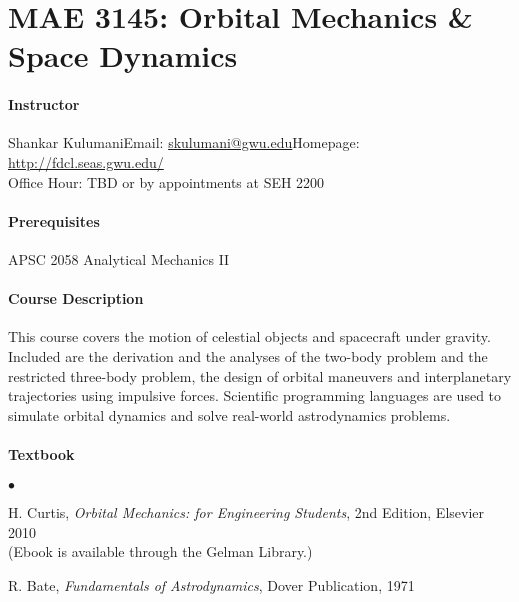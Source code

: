\documentclass[10pt]{article}
\date{}
\begin{document}
\pagestyle{empty}
\section*{MAE 3145: Orbital Mechanics \& Space Dynamics}
\vspace*{-0.4cm}


\paragraph*{Instructor}
Shankar Kulumani\quad Email: \href{mailto:skulumani@gwu.edu}{skulumani@gwu.edu}\quad Homepage: \url{http://fdcl.seas.gwu.edu/}\\
\hspace*{1.8cm}
Office Hour: TBD or by appointments at SEH 2200


\paragraph*{Prerequisites} APSC 2058 Analytical Mechanics II

\paragraph*{Course Description} This course covers the motion of celestial objects and spacecraft under gravity. Included are the derivation and the analyses of the two-body problem and the restricted three-body problem, the design of orbital maneuvers and interplanetary trajectories using impulsive forces.
Scientific programming languages are used to simulate orbital dynamics and solve real-world astrodynamics problems.

\paragraph*{Textbook}
\begin{list}{$\bullet$}{\setlength{\itemsep}{-3pt}}\item 
H. Curtis, \textit{Orbital Mechanics: for Engineering Students}, 2nd Edition, Elsevier 2010\\
(Ebook is available through the Gelman Library.)
\item R. Bate, \textit{Fundamentals of Astrodynamics}, Dover Publication, 1971
\end{list}
\end{document}
